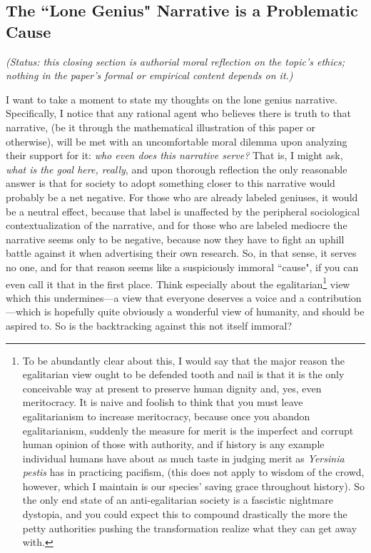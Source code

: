 \documentclass{article}
\begin{document}
\subsection{The ``Lone Genius" Narrative is a Problematic Cause}\label{app:lonegenius}

\noindent\emph{(Status: this closing section is authorial moral reflection on the topic's ethics; nothing in the paper's formal or empirical content depends on it.)}

I want to take a moment to state my thoughts on the lone genius narrative. Specifically, I notice that any rational agent who believes there is truth to that narrative, (be it through the mathematical illustration of this paper or otherwise), will be met with an uncomfortable moral dilemma upon analyzing their support for it: \textit{who even does this narrative serve?}
That is, I might ask, \textit{what is the goal here, really}, and upon thorough reflection the only reasonable answer is that for society to adopt something closer to this narrative would probably be a net negative. For those who are already labeled geniuses, it would be a neutral effect, because that label is unaffected by the peripheral sociological contextualization of the narrative, and for those who are labeled mediocre the narrative seems only to be negative, because now they have to fight an uphill battle against it when advertising their own research. So, in that sense, it serves no one, and for that reason seems like a suspiciously immoral ``cause", if you can even call it that in the first place. Think especially about the egalitarian\footnote{To be abundantly clear about this, I would say that the major reason the egalitarian view ought to be defended tooth and nail is that it is the only conceivable way at present to preserve human dignity and, yes, even meritocracy. It is naive and foolish to think that you must leave egalitarianism to increase meritocracy, because once you abandon egalitarianism, suddenly the measure for merit is the imperfect and corrupt human opinion of those with authority, and if history is any example individual humans have about as much taste in judging merit as \textit{Yersinia pestis} has in practicing pacifism, (this does not apply to wisdom of the crowd, however, which I maintain is our species' saving grace throughout history). So the only end state of an anti-egalitarian society is a fascistic nightmare dystopia, and you could expect this to compound drastically the more the petty authorities pushing the transformation realize what they can get away with.} view which this undermines---a view that everyone deserves a voice and a contribution---which is hopefully quite obviously a wonderful view of humanity, and should be aspired to. So is the backtracking against this not itself immoral?
\end{document}
